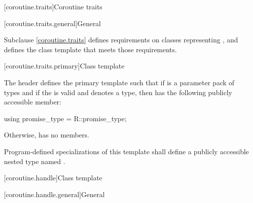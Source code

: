 [coroutine.traits]{Coroutine traits}

[coroutine.traits.general]{General}

\pnum
Subclause \ref{coroutine.traits} defines requirements on classes representing
,
and defines the class template
that meets those requirements.

[coroutine.traits.primary]{Class template }

%
\pnum
The header  defines the primary template
 such that
if  is a parameter pack of types and
if the   is valid and
denotes a type,
then  has the following publicly
accessible member:

\begin{codeblock}
using promise_type = R::promise_type;
\end{codeblock}

Otherwise,  has no members.

\pnum
Program-defined specializations of this template shall define a publicly
accessible nested type named .

[coroutine.handle]{Class template }

[coroutine.handle.general]{General}

